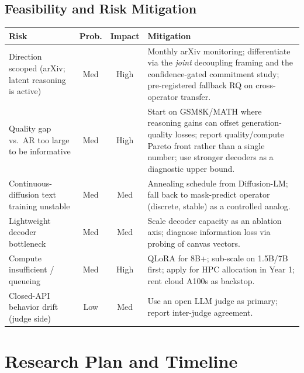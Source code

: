 \documentclass[11pt,a4paper]{article}
\begin{document}
\subsection{Feasibility and Risk Mitigation}
\begin{table}[h]
\centering\small
\begin{tabularx}{\textwidth}{l c c X}
\toprule
\textbf{Risk} & \textbf{Prob.} & \textbf{Impact} & \textbf{Mitigation} \\
\midrule
Direction scooped (arXiv; latent reasoning is active) & Med & High & Monthly arXiv monitoring; differentiate via the \emph{joint} decoupling framing and the confidence-gated commitment study; pre-registered fallback RQ on cross-operator transfer. \\
Quality gap vs.\ AR too large to be informative & Med & High & Start on GSM8K/MATH where reasoning gains can offset generation-quality losses; report quality/compute Pareto front rather than a single number; use stronger decoders as a diagnostic upper bound. \\
Continuous-diffusion text training unstable & Med & Med & Annealing schedule from Diffusion-LM; fall back to mask-predict operator (discrete, stable) as a controlled analog. \\
Lightweight decoder bottleneck & Med & Med & Scale decoder capacity as an ablation axis; diagnose information loss via probing of canvas vectors. \\
Compute insufficient / queueing & Med & High & QLoRA for 8B+; sub-scale on 1.5B/7B first; apply for HPC allocation in Year 1; rent cloud A100s as backstop. \\
Closed-API behavior drift (judge side) & Low & Med & Use an open LLM judge as primary; report inter-judge agreement. \\
\bottomrule
\end{tabularx}
\end{table}

\section{Research Plan and Timeline}
\end{document}
